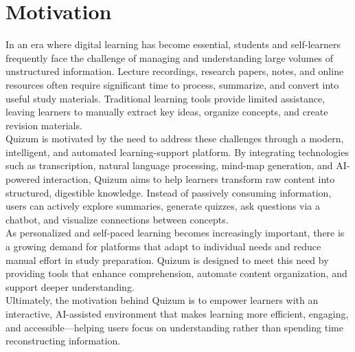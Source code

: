 \section{Motivation}
In an era where digital learning has become essential, students and self-learners frequently face the challenge of managing and understanding large volumes of unstructured information. Lecture recordings, research papers, notes, and online resources often require significant time to process, summarize, and convert into useful study materials. Traditional learning tools provide limited assistance, leaving learners to manually extract key ideas, organize concepts, and create revision materials.\\

Quizum is motivated by the need to address these challenges through a modern, intelligent, and automated learning-support platform. By integrating technologies such as transcription, natural language processing, mind-map generation, and AI-powered interaction, Quizum aims to help learners transform raw content into structured, digestible knowledge. Instead of passively consuming information, users can actively explore summaries, generate quizzes, ask questions via a chatbot, and visualize connections between concepts.\\

As personalized and self-paced learning becomes increasingly important, there is a growing demand for platforms that adapt to individual needs and reduce manual effort in study preparation. Quizum is designed to meet this need by providing tools that enhance comprehension, automate content organization, and support deeper understanding.\\

Ultimately, the motivation behind Quizum is to empower learners with an interactive, AI-assisted environment that makes learning more efficient, engaging, and accessible—helping users focus on understanding rather than spending time reconstructing information.\\